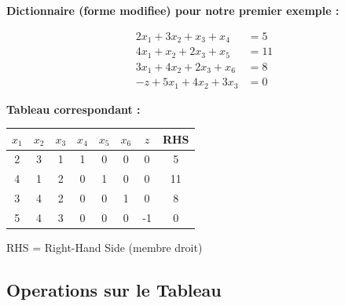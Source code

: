 \documentclass[12pt,a4paper]{article}
\begin{document}
\begin{exemple}
\textbf{Dictionnaire (forme modifiee) pour notre premier exemple :}

\begin{align*}
2x_1 + 3x_2 + x_3 + x_4 &= 5\\
4x_1 + x_2 + 2x_3 + x_5 &= 11\\
3x_1 + 4x_2 + 2x_3 + x_6 &= 8\\
-z + 5x_1 + 4x_2 + 3x_3 &= 0
\end{align*}

\textbf{Tableau correspondant :}

\begin{center}
\begin{tabular}{ccccccc|c}
\toprule
$x_1$ & $x_2$ & $x_3$ & $x_4$ & $x_5$ & $x_6$ & $z$ & RHS \\
\midrule
2 & 3 & 1 & 1 & 0 & 0 & 0 & 5 \\
4 & 1 & 2 & 0 & 1 & 0 & 0 & 11 \\
3 & 4 & 2 & 0 & 0 & 1 & 0 & 8 \\
\midrule
5 & 4 & 3 & 0 & 0 & 0 & -1 & 0 \\
\bottomrule
\end{tabular}
\end{center}

RHS = Right-Hand Side (membre droit)
\end{exemple}

\newpage
\subsection{Operations sur le Tableau}
\end{document}
